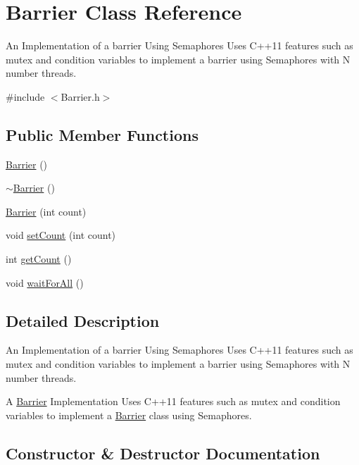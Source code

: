 \hypertarget{class_barrier}{}\section{Barrier Class Reference}
\label{class_barrier}


An Implementation of a barrier Using Semaphores Uses C++11 features such as mutex and condition variables to implement a barrier using Semaphores with N number threads.  




{\ttfamily \#include $<$Barrier.\+h$>$}

\subsection*{Public Member Functions}
\begin{DoxyCompactItemize}
\item 
\hyperlink{class_barrier_a462a2435e07b6fabc0265011f03310ee}{Barrier} ()
\item 
\hyperlink{class_barrier_a401f40e73302009b305904ffc7825304}{$\sim$\+Barrier} ()
\item 
\hyperlink{class_barrier_a68730c862911d37696957056595aa604}{Barrier} (int count)
\item 
void \hyperlink{class_barrier_ab999e172844330d8b9a1c13f3766959d}{set\+Count} (int count)
\item 
int \hyperlink{class_barrier_a471bfe5ce54384baa7dbd195ae3a7b30}{get\+Count} ()
\item 
void \hyperlink{class_barrier_a59b259f25f6acdc5f943398035d2d87a}{wait\+For\+All} ()
\end{DoxyCompactItemize}


\subsection{Detailed Description}
An Implementation of a barrier Using Semaphores Uses C++11 features such as mutex and condition variables to implement a barrier using Semaphores with N number threads. 

A \hyperlink{class_barrier}{Barrier} Implementation Uses C++11 features such as mutex and condition variables to implement a \hyperlink{class_barrier}{Barrier} class using Semaphores. 

\subsection{Constructor \& Destructor Documentation}
